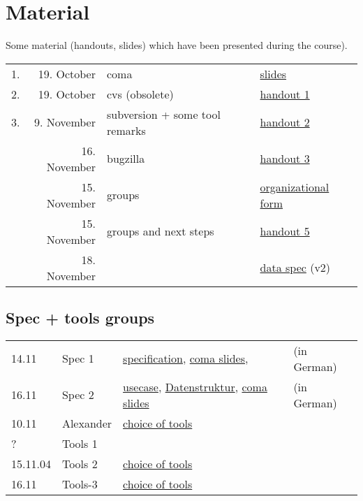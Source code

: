 

\section*{Material}

Some material (handouts, slides) which have been presented during the
course).

\begin{tabular}{r@{\quad\quad}rll}
  \hline
  1. & 19. October & coma  & 
  \href{slides/main-coma.pdf}{slides}
  \\
  2. & 19. October & cvs (obsolete) & \href{handouts/handout1.pdf}{handout 1}
  \\
  3. & 9. November & subversion + some tool remarks &
  \href{handouts/handout2.pdf}{handout 2}
  \\
   & 16. November & bugzilla &
  \href{handouts/handout3.pdf}{handout 3}
  \\
   & 15. November & groups &
  \href{handouts/handout4.pdf}{organizational form}
  \\
   & 15. November & groups and next steps &
  \href{handouts/handout5.pdf}{handout 5}
  \\\hline 
   & 18. November &  &
  \href{spec/v2/main.pdf}{data spec} (v2)
  \\\hline
\end{tabular}




\subsection{Spec + tools groups}
\label{sec:material.spec-tools}


\begin{tabular}{llll}
  14.11 & Spec 1 & 
  \href{spec/material/spec1/spezifikation.pdf}{specification}, 
  \href{spec/material/spec1/slides.pdf}{coma slides}, 
  & (in German)
  \\
  16.11 & Spec 2 & 
  \href{spec/material/spec2/usecase.pdf}{usecase}, 
  \href{spec/material/spec2/datenstruktur.ps}{Datenstruktur}, 
  \href{spec/material/spec2/slides.pdf}{coma slides}
  & (in German)
  \\
  10.11 & Alexander & \href{spec/material/derenbach/tools.pdf}{choice of tools}
  \\
  ?  & Tools 1 &
  \\
  15.11.04 & Tools 2 &
  \href{spec/material/tool2/tools.pdf}{choice of tools}
  \\
  16.11 & Tools-3 & \href{spec/material/tools3/tools.pdf}{choice of tools}
\end{tabular}




